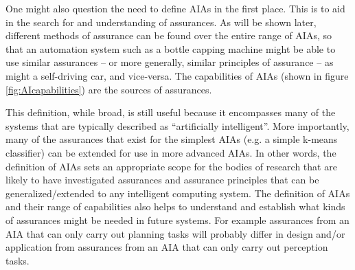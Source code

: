     One might also question the need to define AIAs in the first place. This is to aid in the search for and understanding of assurances. As will be shown later, different methods of assurance can be found over the entire range of AIAs, so that an automation system such as a bottle capping machine might be able to use similar assurances -- or more generally, similar principles of assurance -- as might a self-driving car, and vice-versa. The capabilities of AIAs (shown in figure \ref{fig:AIcapabilities}) are the sources of assurances.

    This definition, while broad, is still useful because it encompasses many of the systems that are typically described as ``artificially intelligent''. More importantly, many of the assurances that exist for the simplest AIAs (e.g. a simple k-means classifier) can be extended for use in more advanced AIAs. In other words, the definition of AIAs sets an appropriate scope for the bodies of research that are likely to have investigated assurances and assurance principles that can be generalized/extended to any intelligent computing system. The definition of AIAs and their range of capabilities also helps to understand and establish what kinds of assurances might be needed in future systems. For example assurances from an AIA that can only carry out planning tasks will probably differ in design and/or application from assurances from an AIA that can only carry out perception tasks. 
